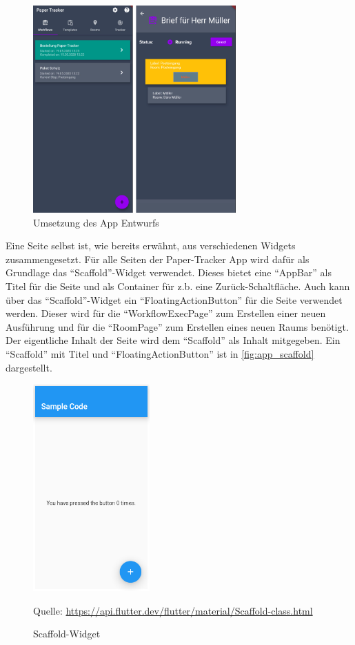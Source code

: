 \begin{figure}[hb]
	\includegraphics[height=300px]{images/app.png}
	\centering
	\caption{Umsetzung des App Entwurfs}
	\label{fig:app_pages}
\end{figure}

Eine Seite selbst ist, wie bereits erwähnt, aus verschiedenen Widgets zusammengesetzt.
Für alle Seiten der Paper-Tracker App wird dafür als Grundlage das \enquote{Scaffold}-Widget verwendet.
Dieses bietet eine \enquote{AppBar} als Titel für die Seite und als Container für z.b. eine Zurück-Schaltfläche.
Auch kann über das \enquote{Scaffold}-Widget ein \enquote{FloatingActionButton} für die Seite verwendet werden.
Dieser wird für die \enquote{WorkflowExecPage} zum Erstellen einer neuen Ausführung und für die \enquote{RoomPage}
zum Erstellen eines neuen Raums benötigt.
Der eigentliche Inhalt der Seite wird dem \enquote{Scaffold} als Inhalt mitgegeben.
Ein \enquote{Scaffold} mit Titel und \enquote{FloatingActionButton} ist in \autoref{fig:app_scaffold} dargestellt.

\begin{figure}[h]
	\includegraphics[height=300px]{images/scaffold.png}
	\centering
	\caption{Scaffold-Widget}
	\small Quelle: \url{https://api.flutter.dev/flutter/material/Scaffold-class.html}
	\label{fig:app_scaffold}
\end{figure}


